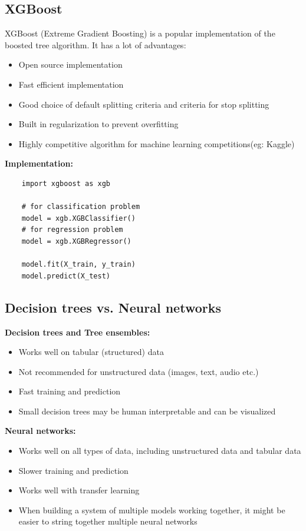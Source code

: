 \subsection*{XGBoost}
XGBoost (Extreme Gradient Boosting) is a popular implementation of the boosted tree algorithm.
It has a lot of advantages:
\begin{itemize}
    \item Open source implementation
    \item Fast efficient implementation
    \item Good choice of default splitting criteria and criteria for stop splitting
    \item Built in regularization to prevent overfitting
    \item Highly competitive algorithm for machine learning competitions(eg: Kaggle)
\end{itemize}
\textbf{Implementation:}
\begin{verbatim}
    import xgboost as xgb

    # for classification problem
    model = xgb.XGBClassifier()
    # for regression problem
    model = xgb.XGBRegressor()

    model.fit(X_train, y_train)
    model.predict(X_test)
\end{verbatim}
\subsection*{Decision trees vs. Neural networks}
\noindent
\textbf{Decision trees and Tree ensembles:}\\
\begin{itemize}
    \item Works well on tabular (structured) data
    \item Not recommended for unstructured data (images, text, audio etc.)
    \item Fast training and prediction
    \item Small decision trees may be human interpretable and can be visualized
\end{itemize}
\par
\noindent
\textbf{Neural networks:}\\
\begin{itemize}
    \item Works well on all types of data, including unstructured data and tabular data
    \item Slower training and prediction
    \item Works well with transfer learning
    \item When building a system of multiple models working together,
    it might be easier to string together multiple neural networks
\end{itemize}
\par